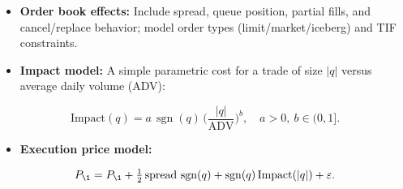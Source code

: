 \documentclass[11pt,a4paper]{article}
\begin{document}
\begin{itemize}
\item   \textbf{Order book effects:} Include spread, queue position, partial fills, and cancel/replace behavior; model order types (limit/market/iceberg) and TIF constraints.
\item   \textbf{Impact model:} A simple parametric cost for a trade of size $|q|$ versus average daily volume (ADV):

\end{itemize}
\begin{equation}
\text{Impact}(q) = a\,\operatorname{sgn}(q)\,\Big(\frac{|q|}{\mathrm{ADV}}\Big)^b,\quad a>0,\ b\in(0,1].
\end{equation}

\begin{itemize}
\item   \textbf{Execution price model:}

\end{itemize}
\begin{equation}
P_{\text{\1}} = P_{\text{\1}} + \tfrac{1}{2}\,\text{spread}\,\operatorname{sgn}(q) + \operatorname{sgn}(q)\,\text{Impact}(|q|) + \varepsilon.
\end{equation}
\end{document}
